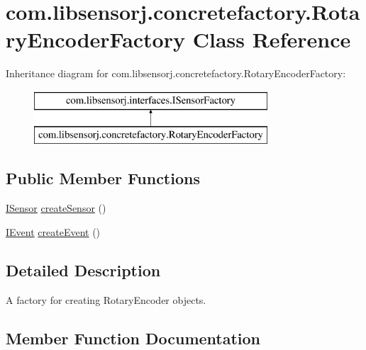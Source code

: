 \hypertarget{classcom_1_1libsensorj_1_1concretefactory_1_1RotaryEncoderFactory}{}\section{com.\+libsensorj.\+concretefactory.\+Rotary\+Encoder\+Factory Class Reference}
\label{classcom_1_1libsensorj_1_1concretefactory_1_1RotaryEncoderFactory}
Inheritance diagram for com.\+libsensorj.\+concretefactory.\+Rotary\+Encoder\+Factory\+:\begin{figure}[H]
\begin{center}
\leavevmode
\includegraphics[height=2.000000cm]{classcom_1_1libsensorj_1_1concretefactory_1_1RotaryEncoderFactory}
\end{center}
\end{figure}
\subsection*{Public Member Functions}
\begin{DoxyCompactItemize}
\item 
\hyperlink{interfacecom_1_1libsensorj_1_1interfaces_1_1ISensor}{I\+Sensor} \hyperlink{classcom_1_1libsensorj_1_1concretefactory_1_1RotaryEncoderFactory_a5f9c404d9b61d8aaf63cad82b87becd7}{create\+Sensor} ()
\item 
\hyperlink{classcom_1_1libsensorj_1_1interfaces_1_1IEvent}{I\+Event} \hyperlink{classcom_1_1libsensorj_1_1concretefactory_1_1RotaryEncoderFactory_a8f36c2cbdddcd1c71d438efafc73ffc2}{create\+Event} ()
\end{DoxyCompactItemize}


\subsection{Detailed Description}
A factory for creating Rotary\+Encoder objects. 

\subsection{Member Function Documentation}
\hypertarget{classcom_1_1libsensorj_1_1concretefactory_1_1RotaryEncoderFactory_a8f36c2cbdddcd1c71d438efafc73ffc2}{}
